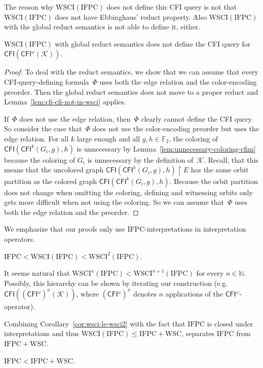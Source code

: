 \documentclass[]{lmcs}
\newcommand{\nat}{\mathbb{N}}
\newcommand{\FF}{\mathbb{F}}
\newcommand{\formA}{\Phi}
\newcommand{\reduct}[2]{#1 \upharpoonright #2}
\newcommand{\GraphClass}{\mathcal{K}}
\newcommand{\IFPC}{\ensuremath{\mathrm{IFPC}}}
\newcommand{\IFPCWSC}{\ensuremath{\mathrm{IFPC{+}WSC}}}
\newcommand{\CFImsym}{\mathsf{CFI}^\omega}
\newcommand{\CFIm}[1]{\CFImsym(#1)}
\newcommand{\CFImk}[2]{\mathsf{CFI}^{#1}(#2)}
\newcommand{\WSCIof}[1]{\mathrm{WSCI}(#1)}
\newcommand{\WSCIkof}[2]{\mathrm{WSCI}^{#1}(#2)}
\newcommand{\CFIsym}{\mathsf{CFI}}
\newcommand{\CFI}[1]{\CFIsym(#1)}
\begin{document}
The reason why $\WSCIof{\IFPC{}}$ does not define this CFI query is not that $\WSCIof{\IFPC{}}$ does not have Ebbinghaus' reduct property.
Also $\WSCIof{\IFPC{}}$ with the global reduct semantics is not able to define it, either.
\begin{lem}
	$\WSCIof{\IFPC{}}$ with global reduct semantics does not define
	the CFI query for $\CFI{\CFIm{\GraphClass}}$.
\end{lem}
\begin{proof}
	To deal with the reduct semantics,
	we show that we can assume that every CFI-query-defining formula~$\formA$
	uses both the edge relation and the color-encoding preorder.
	Then the global reduct semantics does not move to a proper reduct
	and Lemma~\ref{lem:cfi-cfi-not-in-wsci} applies.
	
	If~$\formA$ does not use the edge relation, then~$\formA$ clearly cannot define the CFI query.
	So consider the case that~$\formA$ does not use the color-encoding preorder but uses the edge relation.
	For all $k$ large enough and all $g,h\in\FF_2$, the coloring of $\CFI{\CFImk{k}{G_i,g},h}$ is unnecessary
	by Lemma~\ref{lem:unnecessary-coloring-cfim} because
	the coloring of $G_i$ is unnecessary by the definition of~$\GraphClass$.
	Recall, that this means that the uncolored graph $\reduct{\CFI{\CFImk{k}{G_i,g},h}}{E}$ has the same orbit partition as the colored graph $\CFI{\CFImk{k}{G_i,g},h}$.
	Because the orbit partition does not change when omitting the coloring, defining and witnessing
	orbits only gets more difficult when not using the coloring.
	So we can assume that~$\formA$ uses both the edge relation and the preorder.
\end{proof}
\noindent We emphasize that our proofs only use \IFPC{}-interpretations in interpretation operators.
\begin{cor}
	\label{cor:wsci-le-wsci2}
	$\IFPC{} < \WSCIof{\IFPC{}} < \WSCIkof{2}{\IFPC{}}$.
\end{cor}


It seems natural that $\WSCIkof{n}{\IFPC{}} <  \WSCIkof{n+1}{\IFPC{}}$ for every $n\in \nat$.
Possibly, this hierarchy can be shown by iterating our construction (e.g.~$\CFI{(\CFImsym)^n(\GraphClass)}$,
where $(\CFImsym)^n$ denotes $n$ applications of the $\CFImsym$-operator).

Combining Corollary~\ref{cor:wsci-le-wsci2} with the fact that $\IFPC$ is closed under interpretations and thus $\WSCIof{\IFPC} \leq \IFPCWSC$, separates $\IFPC$ from $\IFPCWSC$.
\begin{cor}
	\label{cor:ifpc-le-wsc}
	$\IFPC{} < \IFPCWSC$.
\end{cor}
\end{document}
